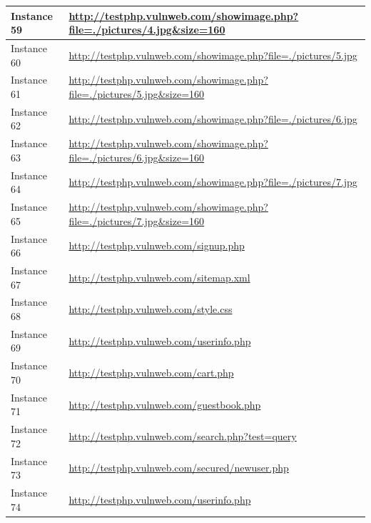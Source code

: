 \documentclass[12pt]{article}
\begin{document}
\begin{center}
\begin{longtable}{|l|p{10cm}|}
\hline
Instance 59 & \url{http://testphp.vulnweb.com/showimage.php?file=./pictures/4.jpg\&size=160} \\
\hline
Instance 60 & \url{http://testphp.vulnweb.com/showimage.php?file=./pictures/5.jpg} \\
\hline
Instance 61 & \url{http://testphp.vulnweb.com/showimage.php?file=./pictures/5.jpg\&size=160} \\
\hline
Instance 62 & \url{http://testphp.vulnweb.com/showimage.php?file=./pictures/6.jpg} \\
\hline
Instance 63 & \url{http://testphp.vulnweb.com/showimage.php?file=./pictures/6.jpg\&size=160} \\
\hline
Instance 64 & \url{http://testphp.vulnweb.com/showimage.php?file=./pictures/7.jpg} \\
\hline
Instance 65 & \url{http://testphp.vulnweb.com/showimage.php?file=./pictures/7.jpg\&size=160} \\
\hline
Instance 66 & \url{http://testphp.vulnweb.com/signup.php} \\
\hline
Instance 67 & \url{http://testphp.vulnweb.com/sitemap.xml} \\
\hline
Instance 68 & \url{http://testphp.vulnweb.com/style.css} \\
\hline
Instance 69 & \url{http://testphp.vulnweb.com/userinfo.php} \\
\hline
Instance 70 & \url{http://testphp.vulnweb.com/cart.php} \\
\hline
Instance 71 & \url{http://testphp.vulnweb.com/guestbook.php} \\
\hline
Instance 72 & \url{http://testphp.vulnweb.com/search.php?test=query} \\
\hline
Instance 73 & \url{http://testphp.vulnweb.com/secured/newuser.php} \\
\hline
Instance 74 & \url{http://testphp.vulnweb.com/userinfo.php} \\
\hline
\end{longtable}
\end{center}\vspace{0.7cm}
\end{document}
